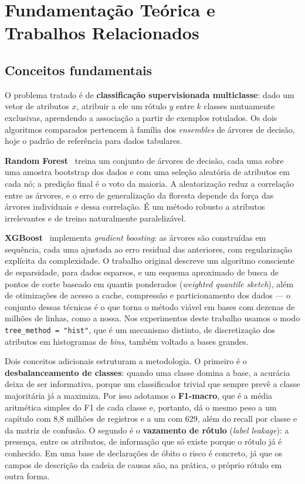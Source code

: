 \documentclass[12pt]{article}
\begin{document}
\section{Fundamentação Teórica e Trabalhos Relacionados}

\subsection{Conceitos fundamentais}

O problema tratado é de \textbf{classificação supervisionada multiclasse}:
dado um vetor de atributos $x$, atribuir a ele um rótulo $y$ entre $k$
classes mutuamente exclusivas, aprendendo a associação a partir de exemplos
rotulados. Os dois algoritmos comparados pertencem à família dos
\emph{ensembles} de árvores de decisão, hoje o padrão de referência para
dados tabulares.

\textbf{Random Forest}~\cite{breiman2001} treina um conjunto de árvores de
decisão, cada uma sobre uma amostra bootstrap dos dados e com uma seleção
aleatória de atributos em cada nó; a predição final é o voto da maioria. A
aleatorização reduz a correlação entre as árvores, e o erro de generalização
da floresta depende da força das árvores individuais e dessa correlação. É um
método robusto a atributos irrelevantes e de treino naturalmente paralelizável.

\textbf{XGBoost}~\cite{chen2016} implementa \emph{gradient boosting}: as
árvores são construídas em sequência, cada uma ajustada ao erro residual das
anteriores, com regularização explícita da complexidade. O trabalho original
descreve um algoritmo consciente de esparsidade, para dados esparsos, e um
esquema aproximado de busca de pontos de corte baseado em quantis ponderados
(\emph{weighted quantile sketch}), além de otimizações de acesso a cache,
compressão e particionamento dos dados --- o conjunto dessas técnicas é o que
torna o método viável em bases com dezenas de milhões de linhas, como a nossa.
Nos experimentos deste trabalho usamos o modo \texttt{tree\_method = "hist"},
que é um mecanismo distinto, de discretização dos atributos em histogramas de
\emph{bins}, também voltado a bases grandes.

Dois conceitos adicionais estruturam a metodologia. O primeiro é o
\textbf{desbalanceamento de classes}: quando uma classe domina a base, a
acurácia deixa de ser informativa, porque um classificador trivial que sempre
prevê a classe majoritária já a maximiza. Por isso adotamos o
\textbf{F1-macro}, que é a média aritmética simples do F1 de cada classe e,
portanto, dá o mesmo peso a um capítulo com 8,8 milhões de registros e a um
com 629, além do recall por classe e da matriz de confusão. O segundo é o
\textbf{vazamento de rótulo} (\emph{label leakage}): a presença, entre os
atributos, de informação que só existe porque o rótulo já é conhecido. Em uma
base de declarações de óbito o risco é concreto, já que os campos de descrição
da cadeia de causas são, na prática, o próprio rótulo em outra forma.
\end{document}
